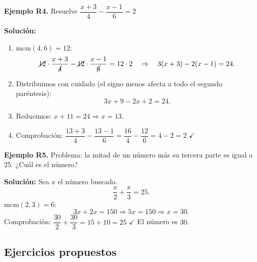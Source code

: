 \documentclass[12pt, letterpaper]{article}
\begin{document}
\textbf{Ejemplo R4.} Resuelve $\dfrac{x + 3}{4} - \dfrac{x - 1}{6} = 2$

\begin{cuadrosolucion}
  \textbf{Solución:}
  \begin{enumerate}
    \item mcm$(4, 6) = 12$:
          $$\cancel{12} \cdot \frac{x + 3}{\cancel{4}} - \cancel{12} \cdot \frac{x - 1}{\cancel{6}} = 12 \cdot 2 \quad \Rightarrow \quad 3(x + 3) - 2(x - 1) = 24.$$
    \item Distribuimos con cuidado (el signo menos afecta a todo el segundo paréntesis):
          $$3x + 9 - 2x + 2 = 24.$$
    \item Reducimos: $x + 11 = 24 \Rightarrow x = 13$.
    \item Comprobación: $\dfrac{13 + 3}{4} - \dfrac{13 - 1}{6} = \dfrac{16}{4} - \dfrac{12}{6} = 4 - 2 = 2$ $\checkmark$
  \end{enumerate}
\end{cuadrosolucion}

\textbf{Ejemplo R5.} Problema: la mitad de un número más su tercera parte es igual a 25. ¿Cuál es el número?

\begin{cuadrosolucion}
  \textbf{Solución:} Sea $x$ el número buscado.
  $$\frac{x}{2} + \frac{x}{3} = 25.$$
  mcm$(2, 3) = 6$:
  $$3x + 2x = 150 \Rightarrow 5x = 150 \Rightarrow x = 30.$$
  Comprobación: $\dfrac{30}{2} + \dfrac{30}{3} = 15 + 10 = 25$ $\checkmark$ \quad El número es $30$.
\end{cuadrosolucion}

\subsection{Ejercicios propuestos}
\end{document}
